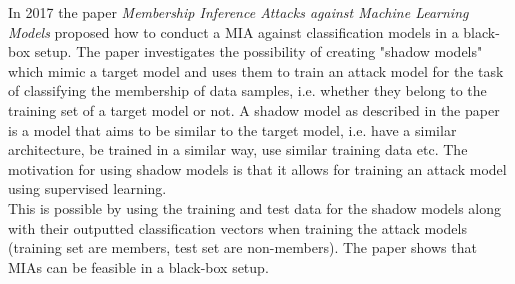 In 2017 the paper \textit{Membership Inference Attacks against Machine Learning Models} \cite{shokri2017membership} proposed how to conduct a \acrlong{MIA} against classification models in a black-box setup. The paper investigates the possibility of creating "shadow models" which mimic a target model and uses them to train an attack model for the task of classifying the membership of data samples, i.e. whether they belong to the training set of a target model or not. A shadow model as described in the paper is a model that aims to be similar to the target model, i.e. have a similar architecture, be trained in a similar way, use similar training data etc. The motivation for using shadow models is that it allows for training an attack model using supervised learning.\\ 
This is possible by using the training and test data for the shadow models along with their outputted classification vectors when training the attack models (training set are members, test set are non-members). The paper shows that MIAs can be feasible in a black-box setup.

